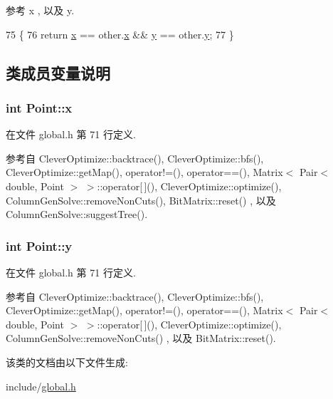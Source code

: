 参考 x , 以及 y.


\begin{DoxyCode}
75     \{
76         \textcolor{keywordflow}{return} \hyperlink{classPoint_a8c779e11e694b20e0946105a9f5de842}{x} == other.\hyperlink{classPoint_a8c779e11e694b20e0946105a9f5de842}{x} && \hyperlink{classPoint_a2e1b5fb2b2a83571f5c0bc0f66a73cf7}{y} == other.\hyperlink{classPoint_a2e1b5fb2b2a83571f5c0bc0f66a73cf7}{y};
77     \}
\end{DoxyCode}


\subsection{类成员变量说明}
\subsubsection[{\texorpdfstring{x}{x}}]{\setlength{\rightskip}{0pt plus 5cm}int Point\+::x}\hypertarget{classPoint_a8c779e11e694b20e0946105a9f5de842}{}\label{classPoint_a8c779e11e694b20e0946105a9f5de842}


在文件 global.\+h 第 71 行定义.



参考自 Clever\+Optimize\+::backtrace(), Clever\+Optimize\+::bfs(), Clever\+Optimize\+::get\+Map(), operator!=(), operator==(), Matrix$<$ Pair$<$ double, Point $>$ $>$\+::operator\mbox{[}$\,$\mbox{]}(), Clever\+Optimize\+::optimize(), Column\+Gen\+Solve\+::remove\+Non\+Cuts(), Bit\+Matrix\+::reset() , 以及 Column\+Gen\+Solve\+::suggest\+Tree().

\subsubsection[{\texorpdfstring{y}{y}}]{\setlength{\rightskip}{0pt plus 5cm}int Point\+::y}\hypertarget{classPoint_a2e1b5fb2b2a83571f5c0bc0f66a73cf7}{}\label{classPoint_a2e1b5fb2b2a83571f5c0bc0f66a73cf7}


在文件 global.\+h 第 71 行定义.



参考自 Clever\+Optimize\+::backtrace(), Clever\+Optimize\+::bfs(), Clever\+Optimize\+::get\+Map(), operator!=(), operator==(), Matrix$<$ Pair$<$ double, Point $>$ $>$\+::operator\mbox{[}$\,$\mbox{]}(), Clever\+Optimize\+::optimize(), Column\+Gen\+Solve\+::remove\+Non\+Cuts() , 以及 Bit\+Matrix\+::reset().



该类的文档由以下文件生成\+:\begin{DoxyCompactItemize}
\item 
include/\hyperlink{global_8h}{global.\+h}\end{DoxyCompactItemize}
